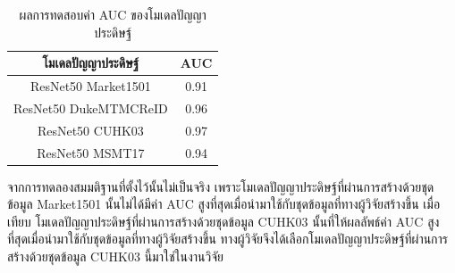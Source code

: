 \clearpage
\begin{table}[!ht]
    \centering
    \begin{tabular}{|c|c|}
            \hline
            {โมเดลปัญญาประดิษฐ์}&{AUC}											\\
            \hline
            ResNet50 Market1501	 		& 0.91								\\
            ResNet50 DukeMTMCReID		& 0.96								\\
            ResNet50 CUHK03				& 0.97								\\
            ResNet50 MSMT17				& 0.94								\\
        \hline
    \end{tabular}
    \caption{ผลการทดสอบค่า AUC ของโมเดลปัญญาประดิษฐ์}
    \label{tab: AUC of model ReID}
\end{table}

จากการทดลองสมมติฐานที่ตั้งไว้นั้นไม่เป็นจริง เพราะโมเดลปัญญาประดิษฐ์ที่ผ่านการสร้างด้วยชุดข้อมูล Market1501 นั้นไม่ได้มีค่า AUC สูงที่สุดเมื่อนำมาใช้กับชุดข้อมูลที่ทางผู้วิจัยสร้างขึ้น เมื่อเทียบ โมเดลปัญญาประดิษฐ์ที่ผ่านการสร้างด้วยชุดข้อมูล CUHK03 นั้นที่ให้ผลลัพธ์ค่า AUC สูงที่สุดเมื่อนำมาใช้กับชุดข้อมูลที่ทางผู้วิจัยสร้างขึ้น ทางผู้วิจัยจึงได้เลือกโมเดลปัญญาประดิษฐ์ที่ผ่านการสร้างด้วยชุดข้อมูล CUHK03 นี้มาใช่ในงานวิจัย